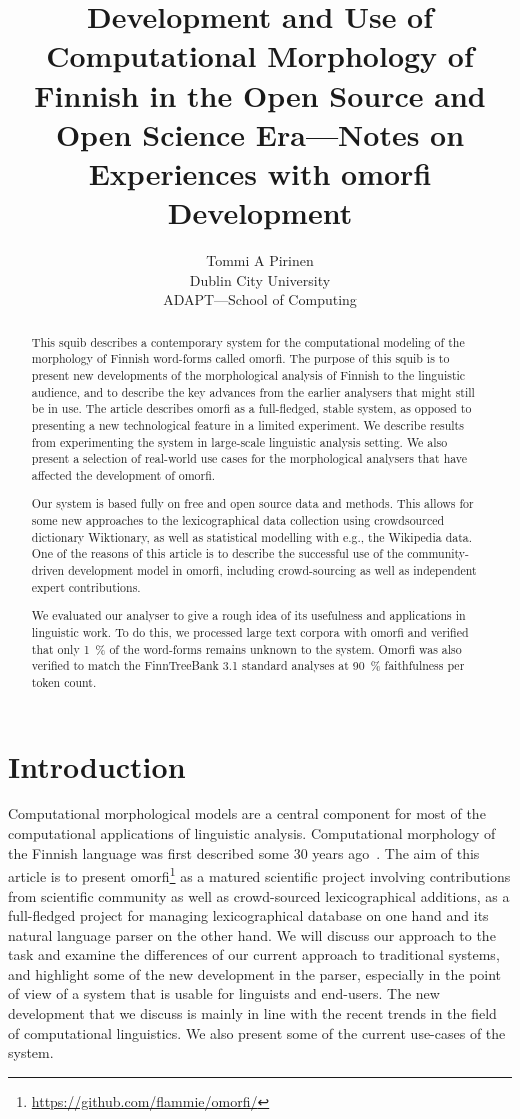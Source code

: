 \documentclass[a4paper,12pt]{article}
\title{Development and Use of Computational Morphology of Finnish in
the Open Source and Open Science Era---Notes on Experiences with omorfi
Development}
\author{Tommi A Pirinen \\
    Dublin City University\\
    ADAPT---School of Computing}
\date{}
\begin{document}
\maketitle
\begin{abstract}

    This squib describes a contemporary system for the computational modeling
    of the morphology of Finnish word-forms called omorfi. The purpose of this
    squib is to present new developments of the morphological analysis of
    Finnish to the linguistic audience, and to describe the key advances from
    the earlier analysers that might still be in use. The article describes
    omorfi as a full-fledged, stable system, as opposed to presenting a new
    technological feature in a limited experiment. We describe results from
    experimenting the system in large-scale linguistic analysis setting. We also
    present a selection of real-world use cases for the morphological analysers
    that have affected the development of omorfi.

    Our system is based fully on free and open source data and methods. This
    allows for some new approaches to the lexicographical data collection using
    crowd\-sour\-ced dictionary Wiktionary, as well as statistical modelling
    with e.g., the Wikipedia data.  One of the reasons of this article is to 
    describe the successful use of the community-driven development model in
    omorfi, including crowd-sourcing as well as independent expert
    contributions.

    We evaluated our analyser to give a rough idea of its usefulness and
    applications in linguistic work. To do this, we processed large text
    corpora with omorfi and verified that only 1~\% of the word-forms
    remains unknown to the system. Omorfi was also verified to match the
    FinnTreeBank 3.1 standard analyses at 90~\% faithfulness per token
    count.
\end{abstract}

\section{Introduction}

Computational morphological models are a central component for most of the
computational applications of linguistic analysis. Computational morphology
of the Finnish language was first described some 30 years
ago~\citep{koskenniemi1983twolevel}. The aim of this article is to present
omorfi\footnote{
\url{https://github.com/flammie/omorfi/}} as a matured scientific project involving contributions from
scientific community as well as crowd-sourced lexicographical additions, as
a full-fledged project for managing lexicographical database on one hand and
its natural language parser on the other hand. We will discuss our approach
to the task and examine the differences of our current approach to
traditional systems, and highlight some of the new development in the
parser, especially in the point of view of a system that is usable for
linguists and end-users. The new development that we discuss is mainly in
line with the recent trends in the field of computational linguistics. We
also present some of the current use-cases of the system.
\end{document}
